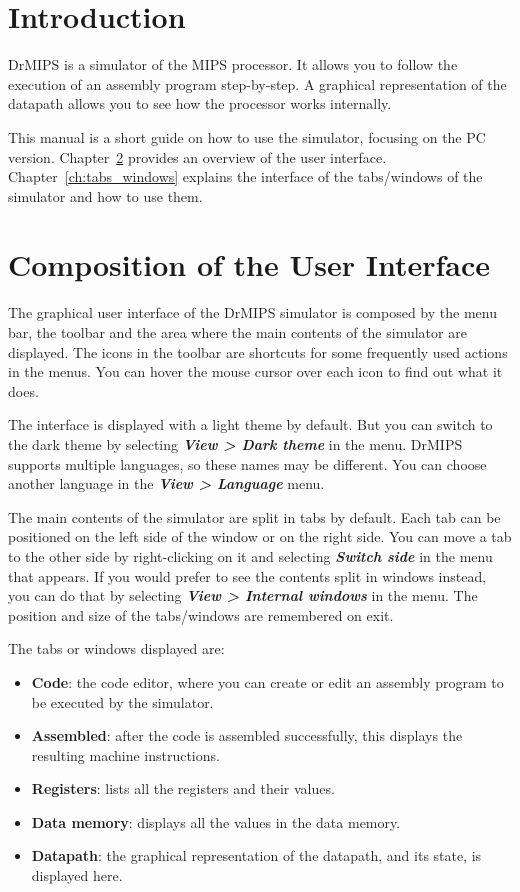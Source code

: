 \documentclass[11pt,a4paper,twoside,titlepage]{report}
\author{Bruno Nova}
\title{\Title}
\newcommand{\menupath}[1]{\textbf{\emph{#1}}}
\begin{document}
\maketitle
\tableofcontents


\chapter{Introduction}

DrMIPS is a simulator of the MIPS processor.
It allows you to follow the execution of an assembly program step-by-step.
A graphical representation of the datapath allows you to see how the
processor works internally.

This manual is a short guide on how to use the simulator, focusing
on the PC version.
Chapter~\ref{ch:composition} provides an overview of the user interface.
Chapter~\ref{ch:tabs_windows} explains the interface of the tabs/windows
of the simulator and how to use them.


\chapter{Composition of the User Interface} \label{ch:composition}

The graphical user interface of the DrMIPS simulator is composed by the menu 
bar, the toolbar and the area where the main contents of the simulator 
are displayed.
The icons in the toolbar are shortcuts for some frequently used actions in the
menus. You can hover the mouse cursor over each icon to find out what it does.

The interface is displayed with a light theme by default. But you can switch
to the dark theme by selecting \menupath{View > Dark theme} in the menu.
DrMIPS supports multiple languages, so these names may be different.
You can choose another language in the \menupath{View > Language} menu.

The main contents of the simulator are split in tabs by default. Each tab can
be positioned on the left side of the window or on the right side. 
You can move a tab to the other side by right-clicking on it and selecting 
\menupath{Switch side} in the menu that appears.
If you would prefer to see the contents split in windows instead, you can do
that by selecting \menupath{View > Internal windows} in the menu.
The position and size of the tabs/windows are remembered on exit.

The tabs or windows displayed are:
\begin{itemize}
	\item \textbf{Code}: the code editor, where you can create or edit an
		assembly program to be executed by the simulator.
	\item \textbf{Assembled}: after the code is assembled successfully, this
		displays the resulting machine instructions.
	\item \textbf{Registers}: lists all the registers and their values.
	\item \textbf{Data memory}: displays all the values in the data memory.
	\item \textbf{Datapath}: the graphical representation of the datapath,
		and its state, is displayed here.
\end{itemize}
\end{document}
